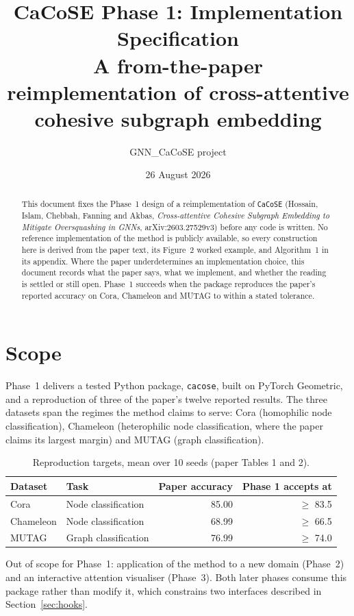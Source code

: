 \documentclass[11pt,a4paper]{article}
\title{\vspace{-2em}CaCoSE Phase 1: Implementation Specification\\
\large A from-the-paper reimplementation of cross-attentive cohesive subgraph embedding}
\author{GNN\_CaCoSE project}
\date{26 August 2026}
\newcommand{\cacose}{\texttt{CaCoSE}}
\begin{document}
\maketitle
\vspace{-1.5em}

\begin{abstract}
\noindent This document fixes the Phase~1 design of a reimplementation of \cacose{} (Hossain,
Islam, Chebbah, Fanning and Akbas, \textit{Cross-attentive Cohesive Subgraph Embedding to Mitigate
Oversquashing in GNNs}, arXiv:2603.27529v3) before any code is written. No reference implementation
of the method is publicly available, so every construction here is derived from the paper text,
its Figure~2 worked example, and Algorithm~1 in its appendix. Where the paper underdetermines an
implementation choice, this document records what the paper says, what we implement, and whether
the reading is settled or still open. Phase~1 succeeds when the package reproduces the paper's reported
accuracy on Cora, Chameleon and MUTAG to within a stated tolerance.
\end{abstract}

\section{Scope}

Phase~1 delivers a tested Python package, \texttt{cacose}, built on PyTorch Geometric, and a
reproduction of three of the paper's twelve reported results. The three datasets span the regimes
the method claims to serve: Cora (homophilic node classification), Chameleon (heterophilic node
classification, where the paper claims its largest margin) and MUTAG (graph classification).

\begin{table}[!htbp]
\centering
\begin{tabular}{llrr}
\toprule
Dataset & Task & Paper accuracy & Phase 1 accepts at \\
\midrule
Cora      & Node classification  & 85.00 & $\geq$ 83.5 \\
Chameleon & Node classification  & 68.99 & $\geq$ 66.5 \\
MUTAG     & Graph classification & 76.99 & $\geq$ 74.0 \\
\bottomrule
\end{tabular}
\caption{Reproduction targets, mean over 10 seeds (paper Tables 1 and 2).}
\end{table}

Out of scope for Phase~1: application of the method to a new domain (Phase~2) and an interactive
attention visualiser (Phase~3). Both later phases consume this package rather than modify it, which
constrains two interfaces described in Section~\ref{sec:hooks}.
\end{document}
